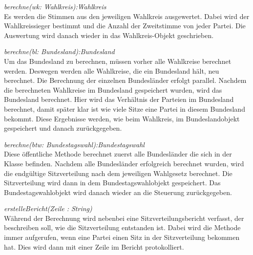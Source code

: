 \documentclass[12pt,a4paper,titlepage]{article}
\newcommand{\mymo}{\fontfamily{pcr}\selectfont \textit}
\begin{document}
\begin{description}

\item {\mymo{berechne(wk: Wahlkreis):Wahlkreis}} \\
Es werden die Stimmen aus den jeweiligen Wahlkreis ausgewertet. Dabei wird der Wahlkreissieger bestimmt und die Anzahl der Zweitstimme von jeder Partei. Die Auswertung wird danach wieder in das Wahlkreis-Objekt geschrieben.
\item {\mymo{berechne(bl: Bundesland):Bundesland}} \\
Um das Bundesland zu berechnen, müssen vorher alle Wahlkreise berechnet werden. Deswegen werden alle Wahlkreise, die ein Bundesland hält, neu berechnet. Die Berechnung der einzelnen Bundesländer erfolgt parallel. Nachdem die berechneten Wahlkreise im Bundesland gespeichert wurden, wird das Bundesland berechnet. Hier wird das Verhältnis der Parteien im Bundesland berechnet, damit später klar ist wie viele Sitze eine Partei in diesem Bundesland bekommt. Diese Ergebnisse werden, wie beim Wahlkreis, im Bundeslandobjekt gespeichert und danach zurückgegeben. 
\item {\mymo{berechne(btw: Bundestagswahl):Bundestagswahl}} \\
Diese öffentliche Methode berechnet zuerst alle Bundesländer die sich in der Klasse befinden. Nachdem alle Bundesländer erfolgreich berechnet wurden, wird die endgültige Sitzverteilung nach dem jeweiligen Wahlgesetz berechnet. Die Sitzverteilung wird dann in dem Bundestagswahlobjekt gespeichert. Das Bundestagswahlobjekt wird danach wieder an die Steuerung zurückgegeben.
\item {\mymo{erstelleBericht(Zeile : String)}} \\
Während der Berechnung wird nebenbei eine Sitzverteilungsbericht verfasst, der beschreiben soll, wie die Sitzverteilung entstanden ist. Dabei wird die Methode immer aufgerufen, wenn eine Partei einen Sitz in der Sitzverteilung bekommen hat. Dies wird dann mit einer Zeile im Bericht protokolliert.
\end{description} 

\newpage
\end{document}
